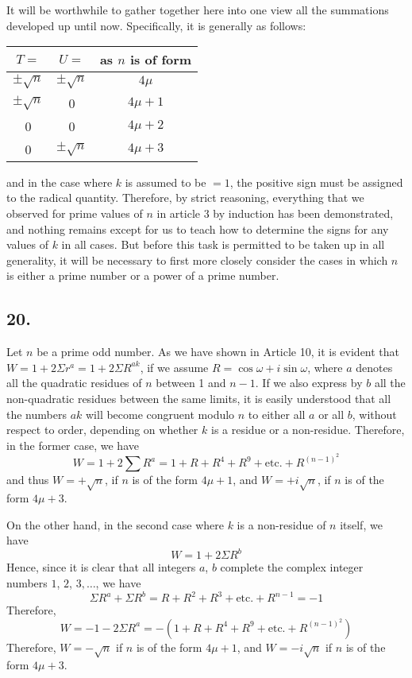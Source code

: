 \documentclass[twoside,12pt, showframe]{memoir}
\begin{document}
It will be worthwhile to gather together here into one view all the summations developed up until now. Specifically, it is generally as follows:
\begin{center}
\begin{tabular}{|c|c|c|}
\hline
\(T=\) & \(U=\) & as \(n\) is of form \\
\hline
\(\pm \surd n\) & \(\pm \surd n\) & \(4 \mu\) \\
\(\pm \surd n\) & 0 & \(4 \mu+1\) \\
0 & 0 & \(4 \mu+2\) \\
0 & \(\pm \surd n\) & \(4 \mu+3\) \\
\hline
\end{tabular}
\end{center}
and in the case where \(k\) is assumed to be \(=1\), the positive sign must be assigned to the radical quantity. Therefore, by strict reasoning, everything that we observed for prime values of \(n\) in article 3 by induction has been demonstrated, and nothing remains except for us to teach how to determine the signs for any values of \(k\) in all cases. But before this task is permitted to be taken up in all generality, it will be necessary to first more closely consider the cases in which \(n\) is either a prime number or a power of a prime number.
%

\subsection*{20.}
 
Let \(n\) be a prime odd number. As we have shown in Article 10, it is evident that \(W=1+2 \Sigma r^{a}=1+2 \Sigma R^{a k}\), if we assume \(R=\cos \omega+i \sin \omega\), where \(a\) denotes all the quadratic residues of \(n\) between 1 and \(n-1\). If we also express by \(b\) all the non-quadratic residues between the same limits, it is easily understood that all the numbers \(a k\) will become congruent modulo \(n\) to either all \(a\) or all \(b\), without respect to order, depending on whether \(k\) is a residue or a non-residue. Therefore, in the former case, we have\clearpage\noindent%
\[W=1+2 \sum R^{a}=1+R+R^{4}+R^{9}+\text{etc.}+R^{(n-1)^{2}}\]
and thus \(W=+\sqrt{n}\), if \(n\) is of the form \(4 \mu+1\), and \(W=+i \sqrt{n}\), if \(n\) is of the form \(4 \mu+3\).
%

On the other hand, in the second case where \(k\) is a non-residue of \(n\) itself, we have
\[W=1+2 \Sigma R^{b}\]
Hence, since it is clear that all integers \(a\), \(b\) complete the complex integer numbers \(1\), \(2\), \(3, \ldots\), we have
\[\Sigma R^{a}+\Sigma R^{b}=R+R^{2}+R^{3}+\text{etc.}+R^{n-1}=-1\]
Therefore,
\[W=-1-2 \Sigma R^{a}=-(1+R+R^{4}+R^{9}+\text{etc.}+R^{(n-1)^{2}})\]
Therefore, \(W=-\sqrt{n}\) if \(n\) is of the form \(4\mu+1\), and \(W=-i\sqrt{n}\) if \(n\) is of the form \(4\mu+3\).
%
\end{document}
